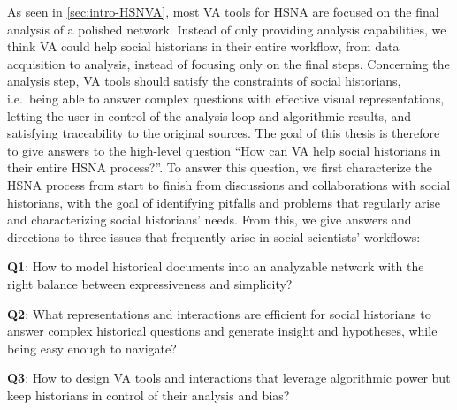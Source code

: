 As seen in \autoref{sec:intro-HSNVA}, most VA tools for HSNA are focused on the final analysis of a polished network.
Instead of only providing analysis capabilities, we think VA could help social historians in their entire workflow, from data acquisition to analysis, instead of focusing only on the final steps.
Concerning the analysis step, VA tools should satisfy the constraints of social historians, i.e.\ being able to answer complex questions with effective visual representations, letting the user in control of the analysis loop and algorithmic results, and satisfying traceability to the original sources.
The goal of this thesis is therefore to give answers to the high-level question ``How can VA help social historians in their entire HSNA process?''.
To answer this question, we first characterize the HSNA process from start to finish from discussions and collaborations with social historians, with the goal of identifying pitfalls and problems that regularly arise and characterizing social historians' needs.
From this, we give answers and directions to three issues that frequently arise in social scientists' workflows:

\newcommand{\qone}{\textbf{Q1}\xspace}
\newcommand{\qtwo}{\textbf{Q2}\xspace}
\newcommand{\qthree}{\textbf{Q3}\xspace}
\begin{description}
    \item \qone:  How to model historical documents into an analyzable network with the right balance between expressiveness and simplicity?
    \item \qtwo:  What representations and interactions are efficient for social historians to answer complex historical questions and generate insight and hypotheses, while being easy enough to navigate?
    \item \qthree: How to design VA tools and interactions that leverage algorithmic power but keep historians in control of their analysis and bias?
\end{description}


